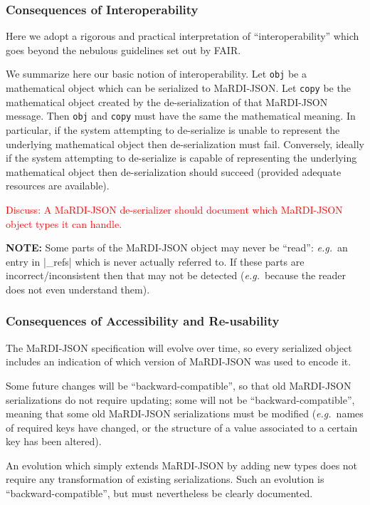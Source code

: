 \documentclass{article}
\newcommand{\blueverb}{\collectverb{\color{blue}\colorbox{gray!20}}}
\newcommand{\MaRDIJSON}{MaRDI-JSON}
\newcommand \eg {\textit{e.g.}}
\def\red#1{\textcolor{red}{#1}}
\begin{document}
\subsubsection{Consequences of Interoperability}

Here we adopt a rigorous and practical interpretation of ``interoperability''
which goes beyond the nebulous guidelines set out by FAIR.

We summarize here our basic notion of interoperability.
Let \verb|obj| be a mathematical object which can be serialized to {\MaRDIJSON}.
Let \verb|copy| be the mathematical object created by the de-serialization of
that {\MaRDIJSON} message.  Then \verb|obj| and \verb|copy| must have the
same the mathematical meaning.  In particular, if the system attempting to
de-serialize is unable to represent the underlying mathematical object then
de-serialization must fail.  Conversely, ideally if the system attempting to
de-serialize is capable of representing the underlying mathematical object
then de-serialization should succeed (provided adequate resources are available).

\red{Discuss: A {\MaRDIJSON} de-serializer should document which {\MaRDIJSON} object
types it can handle.}


\textbf{NOTE:} Some parts of the {\MaRDIJSON} object may never be ``read'': \eg~an
  entry in \blueverb|_refs| which is never actually referred to.  If these
  parts are incorrect/inconsistent then that may not be detected (\eg~because
  the reader does not even understand them).


\subsubsection{Consequences of Accessibility and Re-usability}

The {\MaRDIJSON} specification will evolve over time, so every serialized object
includes an indication of which version of {\MaRDIJSON} was used to encode it.

Some future changes will be ``backward-compatible'', so that old
{\MaRDIJSON} serializations do not require updating; some will not be
``backward-compatible'', meaning that some old {\MaRDIJSON}
serializations must be modified (\eg~names of required keys have
changed, or the structure of a value associated to a certain key has
been altered).

An evolution which simply extends {\MaRDIJSON} by adding new types
does not require any transformation of existing serializations.  Such
an evolution is ``backward-compatible'', but must nevertheless be
clearly documented.
\end{document}
